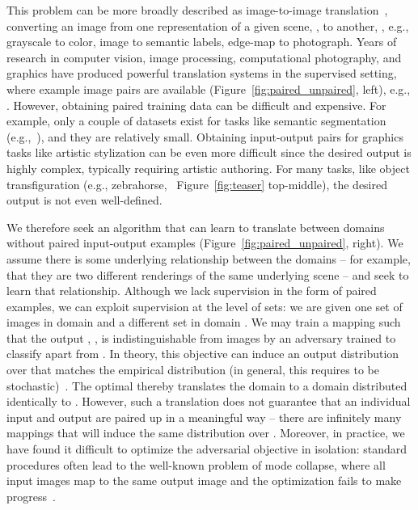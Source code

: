 \documentclass[10pt,twocolumn,letterpaper]{article}
\newcommand{\reffig}[1]{Figure~\ref{fig:#1}}
\begin{document}
This problem can be more broadly described as image-to-image translation~\cite{isola2016image}, converting an image from one representation of a given scene, , to another, , e.g., grayscale to color, image to semantic labels, edge-map to photograph.
Years of research in computer vision, image processing, computational photography, and graphics have produced powerful translation systems in the supervised setting, where example image pairs  are available (\reffig{paired_unpaired}, left), e.g., 
\cite{eigen2015predicting, hertzmann2001image, isola2016image, johnson2016perceptual, laffont2014transient, long2015fully, shih2013data, wang2016generative, xie2015holistically, zhang2016colorful}.
However, obtaining paired training data can be difficult and expensive. For example, only a couple of datasets exist for tasks like semantic segmentation (e.g.,~\cite{Cordts2016Cityscapes}), and they are relatively small.  
Obtaining input-output pairs for graphics tasks like artistic stylization can be even more difficult since the desired output is highly complex, typically requiring artistic authoring. For many tasks, like object transfiguration (e.g., zebrahorse, ~\reffig{teaser} top-middle), the desired output is not even well-defined.


We therefore seek an algorithm that can learn to translate between domains without paired input-output examples (\reffig{paired_unpaired}, right). We assume there is some underlying relationship between the domains -- for example, that they are two different renderings of the same underlying scene -- and seek to learn that relationship. Although we lack supervision in the form of paired examples, we can exploit supervision at the level of sets: we are given one set of images in domain  and a different set in domain . We may train a mapping  such that the output , , is indistinguishable from images  by an adversary trained to classify  apart from . In theory, this objective can induce an output distribution over  that matches the empirical distribution  (in general, this requires  to be stochastic)~\cite{goodfellow2014generative}. The optimal  thereby translates the domain  to a domain  distributed identically to . However, such a translation does not guarantee that an individual input  and output  are paired up in a meaningful way -- there are infinitely many mappings  that will induce the same distribution over . Moreover, in practice, we have found it difficult to optimize the adversarial objective in isolation: standard procedures often lead to the well-known problem of mode collapse, where all input images map to the same output image and the optimization fails to make progress~\cite{goodfellow2016nips}.
\end{document}

